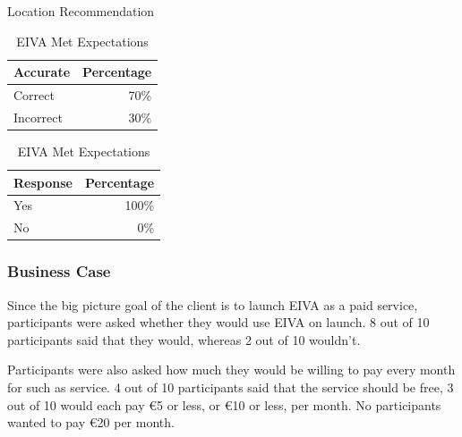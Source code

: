 \documentclass{article}
\begin{document}
\begin{table}[!htb]
	\begin{minipage}{.5\linewidth}
		\caption{Location Recommendation}
		\centering
		\begin{tabular}{lr}
			\hline
			\textbf{Accurate} & \textbf{Percentage} \\
			\hline
			Correct           & 70\%                \\
			Incorrect         & 30\%                \\
			\hline
		\end{tabular}
	\end{minipage}%
	\hspace{.1cm}
	\begin{minipage}{.5\linewidth}
		\centering
		\caption{EIVA Met Expectations}
		\begin{tabular}{lr}
			\hline
			\textbf{Response} & \textbf{Percentage} \\
			\hline
			Yes               & 100\%               \\
			No                & 0\%                 \\
			\hline
		\end{tabular}
	\end{minipage} 
\end{table}

\subsubsection{Business Case}

Since the big picture goal of the client is to launch EIVA as a paid service, participants were asked whether they would use EIVA on launch. 8 out of 10 participants said that they would, whereas 2 out of 10 wouldn't.

Participants were also asked how much they would be willing to pay every month for such as service. 4 out of 10 participants said that the service should be free, 3 out of 10 would each pay €5 or less, or €10 or less, per month. No participants wanted to pay €20 per month.
\end{document}
